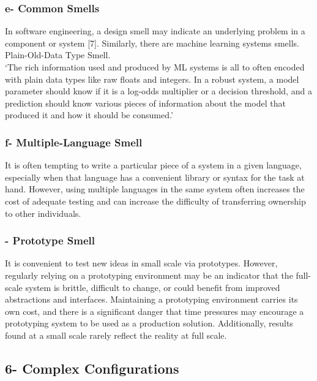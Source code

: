 \documentclass[]{article}
\begin{document}
\subsubsection{e- Common Smells}\label{e--common-smells}

In software engineering, a design smell may indicate an underlying
problem in a component or system {[}7{]}. Similarly, there are machine
learning systems smells. Plain-Old-Data Type Smell.\\
`The rich information used and produced by ML systems is all to often
encoded with plain data types like raw floats and integers. In a robust
system, a model parameter should know if it is a log-odds multiplier or
a decision threshold, and a prediction should know various pieces of
information about the model that produced it and how it should be
consumed.'

\subsubsection{f- Multiple-Language
Smell}\label{f--multiple-language-smell}

It is often tempting to write a particular piece of a system in a given
language, especially when that language has a convenient library or
syntax for the task at hand. However, using multiple languages in the
same system often increases the cost of adequate testing and can
increase the difficulty of transferring ownership to other individuals.

\subsubsection{- Prototype Smell}\label{prototype-smell}

It is convenient to test new ideas in small scale via prototypes.
However, regularly relying on a prototyping environment may be an
indicator that the full-scale system is brittle, difficult to change, or
could benefit from improved abstractions and interfaces. Maintaining a
prototyping environment carries its own cost, and there is a significant
danger that time pressures may encourage a prototyping system to be used
as a production solution. Additionally, results found at a small scale
rarely reflect the reality at full scale.

\subsection{6- Complex Configurations}\label{complex-configurations}
\end{document}
